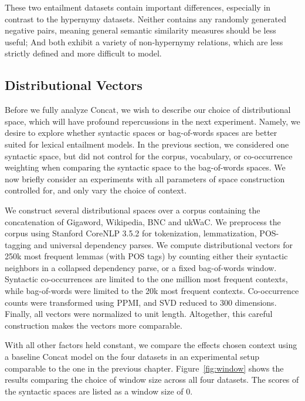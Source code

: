 These two entailment datasets contain important differences, especially in
contrast to the hypernymy datasets. Neither contains any randomly generated
negative pairs, meaning general semantic similarity measures should be less
useful; And both exhibit a variety of non-hypernymy relations, which are less
strictly defined and more difficult to model.

\subsection{Distributional Vectors}

Before we fully analyze Concat, we wish to
describe our choice of distributional space, which will have profound
repercussions in the next experiment. Namely, we desire to explore whether
syntactic spaces or bag-of-words spaces are better suited for lexical
entailment models. In the previous section, we considered one syntactic space,
but did not control for the corpus, vocabulary, or co-occurrence weighting
when comparing the syntactic space to the bag-of-words spaces. We now
briefly consider an experiments with all parameters of space construction
controlled for, and only vary the choice of context.

We construct several distributional spaces over a corpus containing the
concatenation of Gigaword, Wikipedia, BNC and ukWaC.  We preprocess the corpus
using Stanford CoreNLP 3.5.2 \cite{chen:2014:emnlp} for tokenization,
lemmatization, POS-tagging and universal dependency parses. We compute
distributional vectors for 250k most frequent lemmas (with POS tags) by
counting either their syntactic neighbors in a collapsed dependency parse, or a
fixed bag-of-words window. Syntactic co-occurrences are limited to the one
million most frequent contexts, while bag-of-words were limited to the 20k most
frequent contexts. Co-occurrence counts were transformed using PPMI, and SVD
reduced to 300 dimensions. Finally, all vectors were normalized to unit length.
Altogether, this careful construction makes the vectors more comparable.

With all other factors held constant, we compare the effects chosen context
using a baseline Concat model \cite{weeds:2014:coling} on the four datasets in
an experimental setup comparable to the one in the previous chapter.
Figure~\ref{fig:window} shows the results comparing the choice of window
size across all four datasets. The scores of the syntactic spaces are listed
as a window size of 0.

